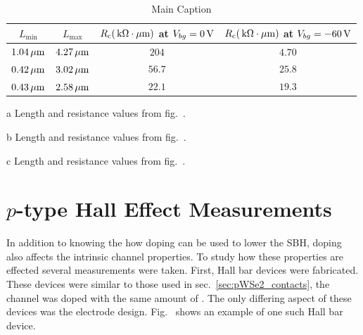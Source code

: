 \begin{table}[ht]
	\centering
	\begin{threeparttable}
		\begin{tabular}{c c c c}
			\hline\hline
			$L_\mathrm{min}$ & $L_\mathrm{max}$ & $R_\mathrm{c}(\,\mathrm{k\Omega\cdot\mu m})$ at $V_{bg} = 0\,\mathrm{V}$ & $R_\mathrm{c}(\,\mathrm{k\Omega\cdot\mu m})$ at $V_{bg} = -60\,\mathrm{V}$ \\ [0.5ex]
			\hline
			$1.04\,\mathrm{\mu m}$ & $4.27\,\mathrm{\mu m}$ & $204$\tnote{a} & $4.70$\tnote{a}\\
			$0.42\,\mathrm{\mu m}$ & $3.02\,\mathrm{\mu m}$ & $56.7$\tnote{b} & $25.8$\tnote{b}\\
			$0.43\,\mathrm{\mu m}$ & $2.58\,\mathrm{\mu m}$ & $22.1$\tnote{c} & $19.3$\tnote{c}\\ [1ex]
			\hline
		\end{tabular}
		\begin{tablenotes}
			\item[a] Length and resistance values from fig.~.
			\item[b] Length and resistance values from fig.~.
			\item[c] Length and resistance values from fig.~.
		\end{tablenotes}
	\caption[Summary of contact resistances for $0.05\%$  doped  channel]{Main Caption}
	\label{table:contact_summary}
	\end{threeparttable}
\end{table}

\section{$p$-type  Hall Effect Measurements}\label{sec:pWSe2_hall}
In addition to knowing the how doping can be used to lower the \acs{SBH}, doping also affects the intrinsic channel properties. To study how these properties are effected several measurements were taken. First, Hall bar devices were fabricated. These devices were similar to those used in sec.~\ref{sec:pWSe2_contacts}, the channel was doped with the same amount of . The only differing aspect of these devices was the electrode design. Fig.~ shows an example of one such Hall bar device. \\ \\

